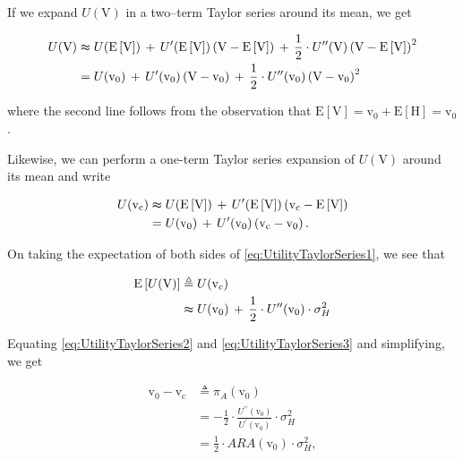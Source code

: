 \documentclass[graybox,envcountchap,sectrefs]{svmono}\usepackage[]{graphicx}\usepackage[]{xcolor}
\begin{document}
\begin{appendices}
If we expand $U(\mathrm{V})$ in a two--term Taylor series around
its mean, we get

\begin{align}
U(\mathrm{V}) & \thickapprox U(\mathrm{\mathit{\mathrm{E}}\left[\mathrm{V}\right]})\,+\,U^{\prime}(\mathrm{\mathit{\mathrm{E}}\left[\mathrm{V}\right]})\left(\mathrm{V}-\mathrm{\mathit{\mathrm{E}}\left[\mathrm{V}\right]}\right)\,+\,\frac{1}{2}\cdot U^{\prime\prime}(\mathrm{V})\left(\mathrm{V}-\mathrm{\mathit{\mathrm{E}}\left[\mathrm{V}\right]}\right)^{2}\nonumber \\
 & =U(\mathrm{v}_{0})\,+\,U^{\prime}(\mathrm{\mathrm{v}_{0}})\left(\mathrm{V}-\mathrm{\mathrm{v}_{0}}\right)\,+\,\frac{1}{2}\cdot U^{\prime\prime}(\mathrm{v}_{0})\left(\mathrm{V}-\mathrm{\mathrm{v}_{0}}\right)^{2}\label{eq:UtilityTaylorSeries1}
\end{align}

where the second line follows from the observation that $\mathrm{E}\left[\mathrm{V}\right]=\mathrm{v}_{0}+\mathrm{E}\left[\mathrm{H}\right]=\mathrm{v}_{0}$. 

Likewise, we can perform a one-term Taylor series expansion of $U(\mathrm{V})$
around its mean and write

\begin{align}
U(\mathrm{\mathit{\mathrm{v}}_{c}}) & \thickapprox U(\mathrm{\mathit{\mathrm{E}}\left[\mathrm{V}\right]})\,+\,U^{\prime}(\mathrm{\mathit{\mathrm{E}}\left[\mathrm{V}\right]})\left(\mathrm{\mathit{\mathrm{v}}_{c}}-\mathrm{\mathit{\mathrm{E}}\left[\mathrm{V}\right]}\right)\nonumber \\
 & =U(\mathrm{v}_{0})\,+\,U^{\prime}(\mathrm{\mathrm{v}_{0}})\left(\mathrm{\mathit{\mathrm{v}}_{c}}-\mathrm{\mathrm{v}_{0}}\right).\label{eq:UtilityTaylorSeries2}
\end{align}

On taking the expectation of both sides of \eqref{eq:UtilityTaylorSeries1},
we see that

\begin{align}
\mathrm{E}\left[U(\mathrm{V})\right] & \triangleq U(\mathrm{v}_{c})\nonumber \\
 & \thickapprox U(\mathrm{v}_{0})\,+\,\frac{1}{2}\cdot U^{\prime\prime}(\mathrm{v}_{0})\cdot\sigma_{H}^{2}\label{eq:UtilityTaylorSeries3}
\end{align}

Equating \eqref{eq:UtilityTaylorSeries2} and \eqref{eq:UtilityTaylorSeries3}
and simplifying, we get

\begin{align}
\mathrm{\mathit{\mathrm{v}}_{0}}-\mathrm{\mathrm{v}_{c}} & \triangleq\pi_{A}\left(\mathrm{\mathit{\mathrm{v}}_{0}}\right)\nonumber \\
 & =-\frac{1}{2}\cdot\frac{U^{\prime\prime}(\mathrm{v}_{0})}{U^{\prime}(\mathrm{v}_{0})}\cdot\sigma_{H}^{2}\nonumber \\
 & =\frac{1}{2}\cdot\mathrm{\mathit{ARA}(\mathrm{v}_{0})}\cdot\sigma_{H}^{2},\label{eq:UtilityTaylorSeries5}
\end{align}


\end{appendices}
\end{document}
